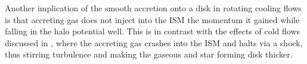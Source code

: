 \documentclass[fleqn,usenatbib]{mnras}
\begin{document}
Another implication of the smooth accretion onto a disk in rotating cooling flows is that accreting gas does not inject into the ISM the momentum it gained while falling in the halo potential well.
This is in contrast with the effects of cold flows discussed in \cite{Dekel2009}, where the accreting gas crashes into the ISM and halts via a shock, thus stirring turbulence and making the gaseous and star forming disk thicker. 
    

    


    

\end{document}
